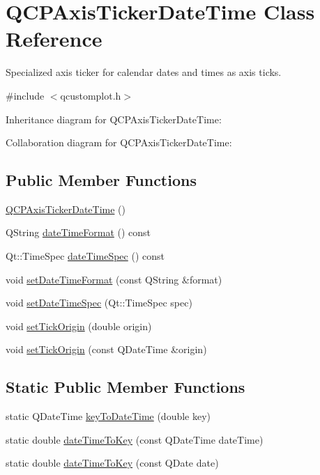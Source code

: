 \hypertarget{class_q_c_p_axis_ticker_date_time}{}\section{Q\+C\+P\+Axis\+Ticker\+Date\+Time Class Reference}
\label{class_q_c_p_axis_ticker_date_time}


Specialized axis ticker for calendar dates and times as axis ticks.  




{\ttfamily \#include $<$qcustomplot.\+h$>$}



Inheritance diagram for Q\+C\+P\+Axis\+Ticker\+Date\+Time\+:


Collaboration diagram for Q\+C\+P\+Axis\+Ticker\+Date\+Time\+:
\subsection*{Public Member Functions}
\begin{DoxyCompactItemize}
\item 
\hyperlink{class_q_c_p_axis_ticker_date_time_a84cc5c6bbc7c99c1f9bd4b3a392e1b9d}{Q\+C\+P\+Axis\+Ticker\+Date\+Time} ()
\item 
Q\+String \hyperlink{class_q_c_p_axis_ticker_date_time_aac8e2bb32ca8ff1394c42d2d62390718}{date\+Time\+Format} () const
\item 
Qt\+::\+Time\+Spec \hyperlink{class_q_c_p_axis_ticker_date_time_ae688e69ba55c9247af26b6db85cf9573}{date\+Time\+Spec} () const
\item 
void \hyperlink{class_q_c_p_axis_ticker_date_time_ad52660a82f688395468674d555f6a86b}{set\+Date\+Time\+Format} (const Q\+String \&format)
\item 
void \hyperlink{class_q_c_p_axis_ticker_date_time_afbd987c7197e42ab61e67fb1c38abebc}{set\+Date\+Time\+Spec} (Qt\+::\+Time\+Spec spec)
\item 
void \hyperlink{class_q_c_p_axis_ticker_date_time_a5388e048cbd32cf1ba730b9f1859eb5c}{set\+Tick\+Origin} (double origin)
\item 
void \hyperlink{class_q_c_p_axis_ticker_date_time_a2ea905872b8171847a49a5e093fb0c48}{set\+Tick\+Origin} (const Q\+Date\+Time \&origin)
\end{DoxyCompactItemize}
\subsection*{Static Public Member Functions}
\begin{DoxyCompactItemize}
\item 
static Q\+Date\+Time \hyperlink{class_q_c_p_axis_ticker_date_time_a4c1761ad057f5564804a53f942629b53}{key\+To\+Date\+Time} (double key)
\item 
static double \hyperlink{class_q_c_p_axis_ticker_date_time_aa24f293f16fff0f937bf71f4140033f1}{date\+Time\+To\+Key} (const Q\+Date\+Time date\+Time)
\item 
static double \hyperlink{class_q_c_p_axis_ticker_date_time_ad87afc7dba65843f68da5ca88bc004f4}{date\+Time\+To\+Key} (const Q\+Date date)
\end{DoxyCompactItemize}
